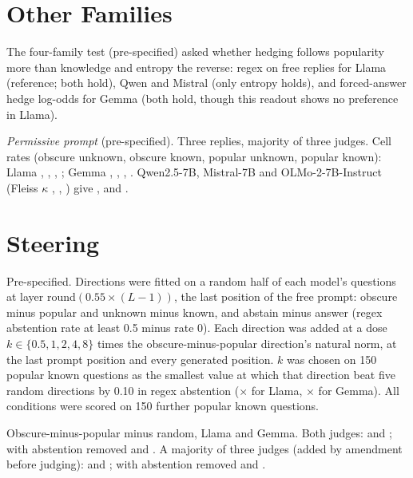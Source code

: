 \documentclass[manuscript,screen,review,anonymous,nonacm]{acmart}
\begin{document}
\section{Other Families}
\label{app:families}

The four-family test (pre-specified) asked whether hedging follows popularity more than knowledge and entropy the reverse: regex on free replies for Llama (reference; both hold), Qwen and Mistral (only entropy holds), and forced-answer hedge log-odds for Gemma (both hold, though this readout shows no preference in Llama).

\emph{Permissive prompt} (pre-specified). Three replies, majority of three judges. Cell rates (obscure unknown, obscure known, popular unknown, popular known): Llama \pmLlamaObsUnk, \pmLlamaObsKnown, \pmLlamaPopUnk, \pmLlamaPopKnown; Gemma \pmGemmaObsUnk, \pmGemmaObsKnown, \pmGemmaPopUnk, \pmGemmaPopKnown. Qwen2.5-7B, Mistral-7B and OLMo-2-7B-Instruct (Fleiss $\kappa$ \pmQwenKappa, \pmMistralKappa, \pmOlmoKappa) give \pmQwenDiff{} \pmQwenDiffCI, \pmMistralDiff{} \pmMistralDiffCI{} and \pmOlmoDiff{} \pmOlmoDiffCI.

\section{Steering}
\label{app:steer}

Pre-specified. Directions were fitted on a random half of each model's questions at layer round$(0.55\times(L-1))$, the last position of the free prompt: obscure minus popular and unknown minus known, and abstain minus answer (regex abstention rate at least 0.5 minus rate 0). Each direction was added at a dose $k\in\{0.5,1,2,4,8\}$ times the obscure-minus-popular direction's natural norm, at the last prompt position and every generated position. $k$ was chosen on 150 popular known questions as the smallest value at which that direction beat five random directions by 0.10 in regex abstention (\svLlamaDose$\times$ for Llama, \svGemmaDose$\times$ for Gemma). All conditions were scored on 150 further popular known questions.

Obscure-minus-popular minus random, Llama and Gemma. Both judges: \svLlamaDOne{} \svLlamaDOneCI{} and \svGemmaDOne{} \svGemmaDOneCI; with abstention removed \svLlamaDTwo{} \svLlamaDTwoCI{} and \svGemmaDTwo{} \svGemmaDTwoCI. A majority of three judges (added by amendment before judging): \svLlamaMajDOne{} \svLlamaMajDOneCI{} and \svGemmaMajDOne{} \svGemmaMajDOneCI; with abstention removed \svLlamaMajDTwo{} \svLlamaMajDTwoCI{} and \svGemmaMajDTwo{} \svGemmaMajDTwoCI.
\end{document}

